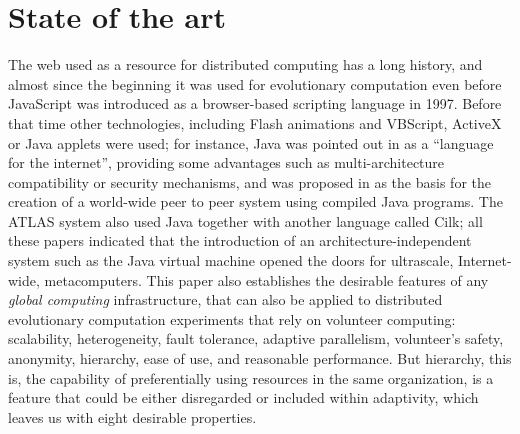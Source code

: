\documentclass[journal,onecolumn]{IEEEtran}
\begin{document}
\section{State of the art}
\label{sec:soa}

The web used as a resource for distributed computing has a
long history, and almost since the beginning it was used for
evolutionary computation even before JavaScript was
introduced as a browser-based scripting language in 1997. Before that
time other technologies,
 including Flash animations and VBScript, ActiveX or Java applets were
used; for instance, Java was pointed out in \cite{soares1998get} as a
``language for the
internet'', providing some advantages such as multi-architecture compatibility or
security mechanisms, and was proposed in \cite{chandy1996world} as the
basis for the creation of a world-wide peer to peer system using compiled Java
programs. The ATLAS system
\cite{Baldeschwieler:1996:TIG:504450.504482} also used Java together
with another language called Cilk; all these papers indicated that
the introduction of an architecture-independent system such as the
Java virtual machine opened the doors for ultrascale, Internet-wide,
metacomputers. This paper also establishes the desirable features of
any {\em global computing} infrastructure, that can also be applied to
distributed evolutionary computation experiments that rely on
volunteer computing: scalability, heterogeneity, fault tolerance,
adaptive parallelism, volunteer's safety, anonymity, hierarchy, ease of use, and
reasonable performance. But hierarchy, this is, the capability of
preferentially using resources in the same organization, is a feature
that could be either disregarded or included within adaptivity, which
leaves us with eight desirable properties. 
\end{document}
